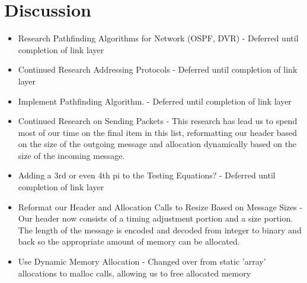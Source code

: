 \documentclass{article}
\begin{document}
\section*{Discussion}
\begin{itemize}
\item Research Pathfinding Algorithms for Network (OSPF, DVR) - Deferred until completion of link layer
\item Continued Research Addressing Protocols - Deferred until completion of link layer
\item Implement Pathfinding Algorithm. -  Deferred until completion of link layer
\item Continued Research on Sending Packets - This research has lead us to spend most of our time on the final item in this list, reformatting our header based on the size of the outgoing message and allocation dynamically based on the size of the incoming message.
\item Adding a 3rd or even 4th pi to the Testing Equations? -  Deferred until completion of link layer
\item Reformat our Header and Allocation Calls to Resize Based on Message Sizes - Our header now consists of a timing adjustment portion and a size portion. The length of the message is encoded and decoded from integer to binary and back so the appropriate amount of memory can be allocated.
\item Use Dynamic Memory Allocation - Changed over from static 'array' allocations to malloc calls, allowing us to free allocated memory
\end{itemize}
\end{document}
